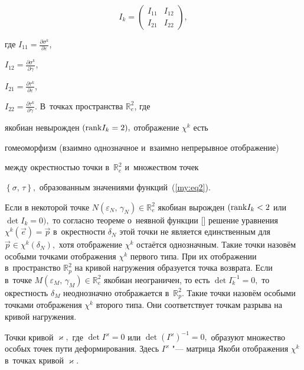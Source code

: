 $$

I_{k}=\left (

 \begin{array}{cc}

         I_{11} & I_{12} \\

         I_{21} & I_{22}

 \end{array}

 \right),

$$

где $I_{11}=\frac{\partial \sigma^k}{\partial \varepsilon}$, 

$I_{12}=\frac{\partial \sigma^k}{\partial \gamma}$, 

$I_{21}=\frac{\partial \tau^k}{\partial \varepsilon}$,

$I_{22}=\frac{\partial \tau^k}{\partial \gamma}.$ В~точках пространства $\mathbb R^2_{e}$, где

якобиан невырожден $({\rm rank} I_{k}=2),$    отображение $\chi^k$   есть

гомеоморфизм (взаимно однозначное и~взаимно непрерывное отображение)

между окрестностью точки в~$\mathbb R^2_{e}$ и~множеством точек

$\left\{\sigma,\, \tau\right\},$ образованным значениями функций~(\ref{my:eq2}).



Если в некоторой точке $N(\varepsilon_{N},\, \gamma_{N})\in \mathbb R^2_{e}$ якобиан вырожден $({\rm rank} I_{k}<2$  или $\det I_{k}=0),$ то согласно теореме о~неявной функции [] решение уравнения $\chi^k(\overrightarrow{e})=\overrightarrow{p}$ в~окрестности $\delta_{N}$  этой точки не является единственным для $\overrightarrow{p}\in\chi^k(\delta_{N}),$ хотя отображение $\chi^k$ остаётся однозначным. Такие точки назовём особыми точками отображения $\chi^k$ первого типа. При их отображении в~пространство $\mathbb R^2_{p}$ на кривой нагружения образуется точка возврата. Если в~точке $M(\varepsilon_{M},\, \gamma_{M})\in \mathbb R^2_{e}$ якобиан неограничен, то есть $\det I^{-1}_{k}=0,$ то окрестность $\delta_{M}$ неоднозначно отображается в~$\mathbb R^2_{p}.$ Такие точки назовём особыми точками отображения $\chi^k$ второго типа. Они соответствует точкам разрыва на кривой нагружения.



Точки кривой $\varkappa,$ где $\det I^{\varkappa}=0$ или  $\det(I^{\varkappa})^{-1}=0,$ образуют множество особых точек пути деформирования. Здесь $I^\varkappa$ "--- матрица Якоби отображения $\chi^k$ в~точках кривой $\varkappa.$




